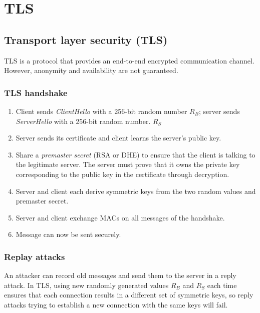 \chapter{TLS}

\section{Transport layer security (TLS)}
TLS is a protocol that provides an end-to-end encrypted communication channel. However, anonymity and availability are not guaranteed.

\subsection{TLS handshake}
\begin{enumerate}
    \item Client sends \emph{ClientHello} with a 256-bit random number $R_B$; server sends \emph{ServerHello} with a 256-bit random number. $R_S$ 
    \item Server sends its certificate and client learns the server's public key.
    \item Share a \emph{premaster secret} (RSA or DHE) to ensure that the client is talking to the legitimate server. The server must prove that it owns the private key corresponding to the public key in the certificate through decryption.
    \item Server and client each derive symmetric keys from the two random values and premaster secret.
    \item Server and client exchange MACs on all messages of the handshake.
    \item Message can now be sent securely.
\end{enumerate}

\subsection{Replay attacks}
An attacker can record old messages and send them to the server in a reply attack. In TLS, using new randomly generated values $R_B$ and $R_S$ each time ensures that each connection results in a different set of symmetric keys, so reply attacks trying to establish a new connection with the same keys will fail.
